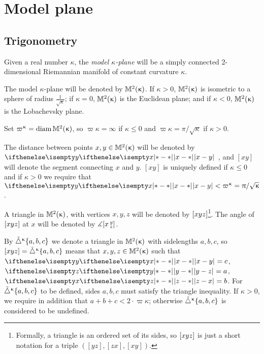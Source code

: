 \chapter{Model plane}

\section{Trigonometry}\label{model}

%
Given a real number $\kappa$, the \emph{model $\kappa$-\hspace{0pt}plane} will be a simply connected 2-\hspace{0pt}dimensional Riemannian manifold of constant curvature $\kappa$.

The  model $\kappa$-plane  will be denoted by $\mathbb{M}_{{}}^{2}({\upkappa})$.
If $\kappa>0$, $\mathbb{M}_{{}}^{2}({\upkappa})$ is isometric to a sphere of radius $\tfrac{1}{\sqrt{\kappa}}$; if $\kappa=0$, $\mathbb{M}_{{}}^{2}({\upkappa})$ is the Euclidean plane; and if $\kappa<0$, $\mathbb{M}_{{}}^{2}({\upkappa})$ is the  Lobachevsky plane.

Set $\varpi\kappa=\diam\Lob2\kappa$\index{$\varpi\kappa$}, so 
$\varpi\kappa=\infty$ if $\kappa\le0$ and $\varpi\kappa=\pi/\sqrt{\kappa}$ if $\kappa>0$.

The distance between points $x,y\in \Lob2\kappa$ will be denoted by $\dist{x}{y}{}$\index{$\dist{*}{*}{}$}
, and $[x y]$\index{$[{*}{*}]$} 
will denote the segment connecting $x$ and $y$. 
$[x y]$ is uniquely defined if $\kappa\le 0$ and if $\kappa>0$ we 
require 
that $\dist{x}{y}{}<\varpi\kappa=\pi/\sqrt{\kappa}$.%

A triangle in $\mathbb{M}_{{}}^{2}({\upkappa})$, with vertices $x,y,z$ will be denoted by $[{x}{y}{z}]$\index{$\trig{{*}}{{*}}{{*}}$}\footnote{Formally, a triangle is an ordered set of its sides, so $[{x}{y}{z}]$ is just a short notation for a triple $([y z],[z x],[x y])$.}.
The angle of $[{x}{y}{z}]$ at $x$ will be denoted by $\measuredangle[x\,{}^{y}_{z}]$\index{$\mangle$}.

By ${\tilde\triangle}^{\upkappa}\{a,b,c\}$\index{$\modtrig\kappa$!$\modtrig\kappa\{{*},{*},{*}\}$} we denote a triangle in 
$\mathbb{M}_{{}}^{2}({\upkappa})$ with sidelengths $a,b,c$, so 
$[{x}{y}{z}]={\tilde\triangle}^{\upkappa}\{a,b,c\}$ means that $x,y,z\in \Lob2\kappa$ such that 
$\dist{x}{y}{}=c$, $\dist{y}{z}{}=a$, $\dist{z}{x}{}=b$.
For ${\tilde\triangle}^{\upkappa}\{a,b,c\}$ to be defined, sides $a,b,c$ must satisfy the triangle inequality.  If $\kappa>0$, we 
require 
in addition that $a+b+c<2\cdot\varpi\kappa$; 
otherwise ${\tilde\triangle}^{\upkappa}\{a,b,c\}$ is considered to be undefined.

